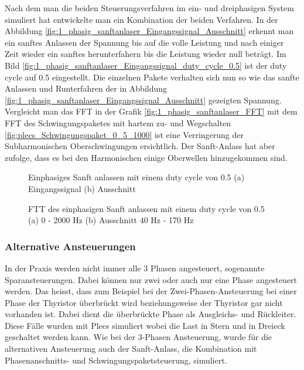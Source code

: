 \newpage


Nach dem man die beiden Steuerungsverfahren im ein- und dreiphasigen System simuliert hat entwickelte man ein Kombination der beiden Verfahren. In der Abbildung \ref{fig:1_phasig_sanftanlaser_Eingangssignal_Ausschnitt} erkennt man ein sanftes Anlassen der Spannung bis auf die volle Leistung und nach einiger Zeit wieder ein sanftes herunterfahern bis die Leistung wieder null beträgt. Im Bild \ref{fig:1_phasig_sanftanlaser_Eingangssignal_duty_cycle_0.5} ist der duty cycle auf 0.5 eingestellt. Die einzelnen Pakete verhalten sich nun so wie das sanfte Anlassen und Runterfahren der in Abbildung \ref{fig:1_phasig_sanftanlaser_Eingangssignal_Ausschnitt} gezeigten Spannung. Vergleicht man das FFT in der Grafik \ref{fig:1_phasig_sanftanlaser_FFT} mit dem FFT des Schwingungspaketes mit hartem zu- und Wegschalten \ref{fig:plecs_Schwingungspaket_0_5_1000} ist eine Verringerung der Subharmonischen Oberschwingungen ersichtlich. Der Sanft-Anlass hat aber zufolge, dass es bei den Harmonischen einige Oberwellen hinzugekommen sind. 

\begin{figure}[ht!]
	\centering
	\qquad
	\caption{Einphasiges Sanft anlassen mit einem duty cycle von 0.5 (a) Eingangssignal (b) Ausschnitt }
	\label{fig:einphasiges_Sanft_anlassen_Einganssignal}
\end{figure}


\begin{figure}[ht!]
	\centering
	\qquad
	\caption{FTT des einphasigen Sanft anlassen mit einem duty cycle von 0.5 (a) 0 - 2000 Hz (b) Ausschnitt 40 Hz - 170 Hz}
	\label{fig:einphasiges_Sanft_anlassen FTT}
\end{figure}



\newpage

\subsubsection{Alternative Ansteuerungen}
In der Praxis werden nicht immer alle 3 Phasen angesteuert, sogenannte Sparansteuerungen. Dabei können nur zwei oder auch nur eine Phase angesteuert werden. Das heisst, dass zum Beispiel bei der Zwei-Phasen-Ansteuerung bei einer Phase der Thyristor überbrückt wird beziehungsweise der Thyristor gar nicht vorhanden ist. Dabei dient die überbrückte Phase als Ausgleichs- und Rückleiter. Diese Fälle wurden mit Plecs simuliert wobei die Last in Stern und in Dreieck geschaltet werden kann. Wie bei der 3-Phasen Ansteuerung, wurde für die alternativen Ansteuerung auch der Sanft-Anlass, die Kombination mit Phasenanschnitts- und Schwingungspaketsteuerung, simuliert.

